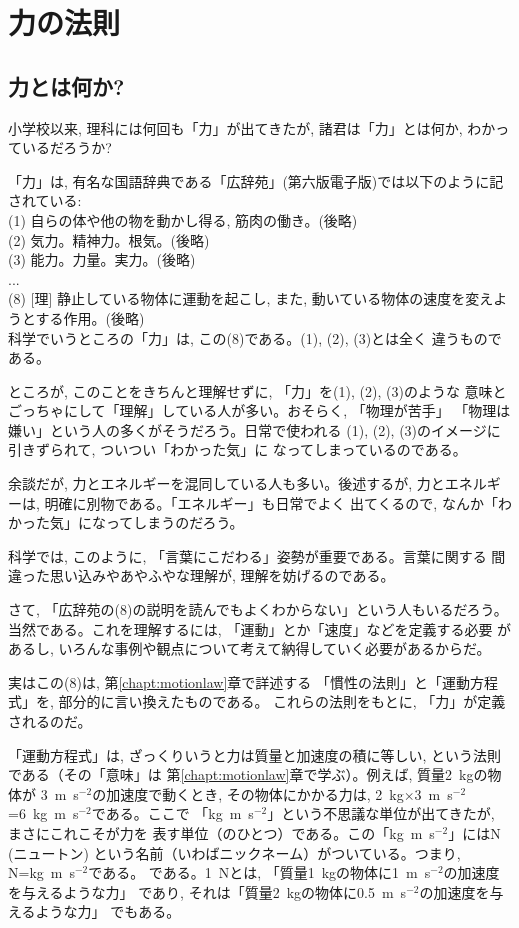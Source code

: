 \chapter{力の法則}
%

\section{力とは何か?}

小学校以来, 理科には何回も「力」が出てきたが, 諸君は「力」とは何か, わかっているだろうか?

「力」は, 有名な国語辞典である「広辞苑」(第六版電子版)では以下のように記されている:\\
(1) 自らの体や他の物を動かし得る, 筋肉の働き。(後略)\\
(2) 気力。精神力。根気。(後略)\\
(3) 能力。力量。実力。(後略)\\
...\\
(8) [理] 静止している物体に運動を起こし, また, 動いている物体の速度を変えようとする作用。(後略)\\

科学でいうところの「力」は, この(8)である。(1), (2), (3)とは全く
違うものである。

ところが, このことをきちんと理解せずに, 「力」を(1), (2), (3)のような
意味とごっちゃにして「理解」している人が多い。おそらく, 「物理が苦手」
「物理は嫌い」という人の多くがそうだろう。日常で使われる
(1), (2), (3)のイメージに引きずられて, ついつい「わかった気」に
なってしまっているのである。

余談だが, 力とエネルギーを混同している人も多い。後述するが, 
力とエネルギーは, 明確に別物である。「エネルギー」も日常でよく
出てくるので, なんか「わかった気」になってしまうのだろう。

科学では, このように, 「言葉にこだわる」姿勢が重要である。言葉に関する
間違った思い込みやあやふやな理解が, 理解を妨げるのである。

さて, 「広辞苑の(8)の説明を読んでもよくわからない」という人もいるだろう。
当然である。これを理解するには, 「運動」とか「速度」などを定義する必要
があるし, いろんな事例や観点について考えて納得していく必要があるからだ。

実はこの(8)は, 第\ref{chapt:motionlaw}章で詳述する
「慣性の法則」と「運動方程式」を, 部分的に言い換えたものである。
これらの法則をもとに, 「力」が定義されるのだ。

「運動方程式」は, ざっくりいうと力は質量と加速度の積に等しい, 
という法則である（その「意味」は
第\ref{chapt:motionlaw}章で学ぶ）。例えば, 質量2~kgの物体が
3~m~s$^{-2}$の加速度で動くとき, その物体にかかる力は, 
2~kg$\times$3~m~s$^{-2}$=6~kg~m~s$^{-2}$である。ここで
「kg~m~s$^{-2}$」という不思議な単位が出てきたが, まさにこれこそが力を
表す単位（のひとつ）である。この「kg~m~s$^{-2}$」にはN (ニュートン)
という名前（いわばニックネーム）がついている。つまり, N=kg~m~s$^{-2}$である。
である。1~Nとは, 「質量1~kgの物体に1~m~s$^{-2}$の加速度を与えるような力」
であり, それは「質量2~kgの物体に0.5~m~s$^{-2}$の加速度を与えるような力」
でもある。

